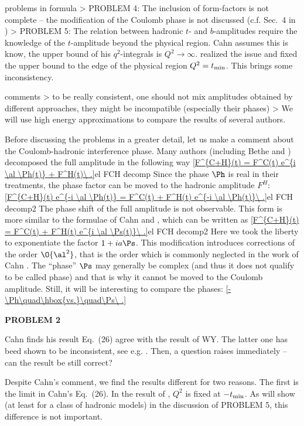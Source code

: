 \> problems in \KL{} formula
\>> PROBLEM 4: The inclusion of form-factors is not complete -- the modification of the Coulomb phase is not discussed (c.f. Sec.~4 in )
\>> PROBLEM 5: The relation between hadronic $t$- and $b$-amplitudes require the knowledge of the $t$-amplitude beyond the physical region. Cahn assumes this is know, the upper bound of his $q^2$-integrals is $Q^2\to\infty$. \KL{} realized the issue and fixed the upper bound to the edge of the physical region $Q^2 = t_{\rm min}$. This brings some inconsistency.

\> comments
\>> to be really consistent, one should not mix amplitudes obtained by different approaches, they might be incompatible (especially their phases) 
\>> We will use high energy approximations to compare the results of several authors.

\vskip1cm


Before discussing the problems in a greater detail, let us make a comment about the Coulomb-hadronic interference phase. Many authors (including Bethe  and \WY{} ) decomposed the full amplitude in the following way
\eqref{F^{C+H}(t) = F^C(t) e^{i \al \Ph(t)} + F^H(t)\ .}{el FCH decomp}
Since the phase $\Ph$ is real in their treatments, the phase factor can be moved to the hadronic amplitude $F^H$:
\eqref{F^{C+H}(t) e^{-i \al \Ph(t)} = F^C(t) + F^H(t) e^{-i \al \Ph(t)}\ .}{el FCH decomp2}
The phase shift of the full amplitude is not observable. This form is more similar to the formulae of Cahn  and \KL{} , which can be written as
\eqref{F^{C+H}(t) = F^C(t) + F^H(t) e^{i \al \Ps(t)}\ .}{el FCH decomp2}
Here we took the liberty to exponentiate the factor $1+ia\Ps$. This modification introduces corrections of the order $\O{\al^2}$, that is the order which is commonly neglected in the work of Cahn . The ``phase'' $\Ps$ may generally be complex (and thus it does not qualify to be called phase) and that is why it cannot be moved to the Coulomb amplitude. Still, it will be interesting to compare the phases:
\eqref{-\Ph\quad\hbox{vs.}\quad\Ps\ .}{}



{\bf PROBLEM 2}

Cahn finds his result Eq.~(26) agree with the result of WY. The latter one has beed shown to be inconsistent, see e.g. . Then, a question raises immediately -- can the result be still correct?

Despite Cahn's comment, we find the results different for two reasons. The first is the limit in Cahn's Eq.~(26). In the result of \WaY{}, $Q^2$ is fixed at $-t_{\rm min}$. As will show (at least for a class of hadronic models) in the discussion of PROBLEM 5, this difference is not important.

